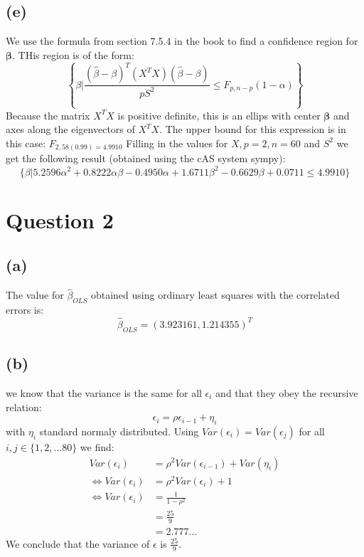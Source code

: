 \documentclass[a4paper]{article}
\begin{document}
\subsection*{(e)}
We use the formula from section 7.5.4 in the book to find a confidence region for $\mathbf{\beta}$. THis region is of the form:
\begin{equation}
	\left\{ \beta \bigg| \frac{(\hat{\beta}-\beta)^T (X^TX) (\hat{\beta}-\beta)}{pS^2} \leq F_{p,n-p}(1-\alpha) \right\}
\end{equation}
Because the matrix $X^TX$ is positive definite, this is an ellips with center $\mathbf{\beta}$ and axes along the eigenvectors of $X^TX$. The upper bound for this expression is in this case: $F_{2,58(0.99) = 4.9910}$ Filling in the values for $X, p=2, n=60$ and $S^2$ we get the following result (obtained using the cAS system sympy):
\begin{equation*}
	\{ \beta | 5.2596 \alpha^{2} + 0.8222 \alpha \beta - 0.4950 \alpha + 1.6711 \beta^{2} - 0.6629 \beta + 0.0711 \leq 4.9910 \}
\end{equation*}


\section*{Question 2}

\subsection*{(a)}
The value for $\hat{\beta}_{OLS}$ obtained using ordinary least squares with the correlated errors is:
\begin{equation}
	\hat{\beta}_{OLS} = (3.923161, 1.214355)^T
\end{equation}

\subsection*{(b)}
we know that the variance is the same for all $\epsilon_i$ and that they obey the recursive relation:
\begin{equation*}
	\epsilon_i = \rho \epsilon_{i-1} + \eta_i
\end{equation*}
with $\eta_i$ standard normaly distributed. Using $Var(\epsilon_i) =Var(\epsilon_j)$ for all $i, j \in \{1, 2, \ldots 80\}$ we find:
\begin{align*}
	Var(\epsilon_i) &= \rho^2 Var(\epsilon_{i-1}) + Var(\eta_i)\\
	\Leftrightarrow Var(\epsilon_i) &= \rho^2 Var(\epsilon_i) + 1\\
	\Leftrightarrow Var(\epsilon_i) &= \frac{1}{1-\rho^2}\\
					&= \frac{25}{9}\\
					&= 2.777 \ldots
\end{align*}
We conclude that the variance of $\epsilon$ is $ \frac{25}{9}$.
\end{document}
